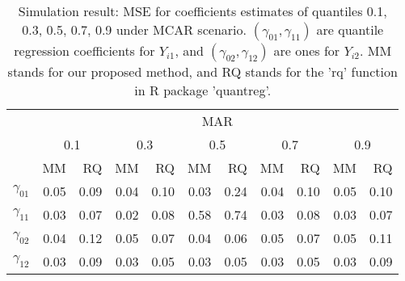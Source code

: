 \documentclass[12pt]{article}
\begin{document}
\begin{table}
  \renewcommand{\arraystretch}{1.3}
  \centering
  \caption{Simulation result: MSE for coefficients estimates of quantiles
    0.1, 0.3, 0.5, 0.7, 0.9 under MCAR scenario. $(\gamma_{01}, \gamma_{11})$ 
    are quantile regression coefficients for $Y_{i1}$, and $(\gamma_{02}, \gamma_{12})$ 
    are ones for $Y_{i2}$. MM stands for our proposed method, and RQ stands for the 'rq' 
    function in R package 'quantreg'.}
  \vspace{10pt}
  \begin{tabular}{rrrrrrrrrrr}
    \toprule
    & \multicolumn{ 10}{c}{MAR} \\
    \cline{2-11}
    &  \multicolumn{2}{c}{0.1} &  \multicolumn{2}{c}{0.3} &  \multicolumn{2}{c}{0.5} 
    &  \multicolumn{2}{c}{0.7} &  \multicolumn{2}{c}{0.9} \\
    \cline{2-11}
    & MM & RQ    & MM & RQ    & MM & RQ    & MM & RQ    & MM & RQ \\
    \hline
    $\gamma_{01}$ &  0.05 &0.09& 0.04  &0.10 &0.03 &0.24 &0.04 &0.10 &0.05 &0.10 \\
    $\gamma_{11}$ &  0.03 &0.07&  0.02 &0.08 &0.58 &0.74 &0.03 &0.08 &0.03 &0.07 \\ 
    $\gamma_{02}$ & 0.04  &0.12&  0.05 &0.07 &0.04 &0.06 &0.05 &0.07 &0.05 &0.11 \\ 
    $\gamma_{12}$ &  0.03 & 0.09& 0.03 &0.05 &0.03 &0.05 &0.03 &0.05 &0.03 &0.09 \\ 
    \bottomrule
  \end{tabular}  \label{tab:sim}
\end{table}
\end{document}
